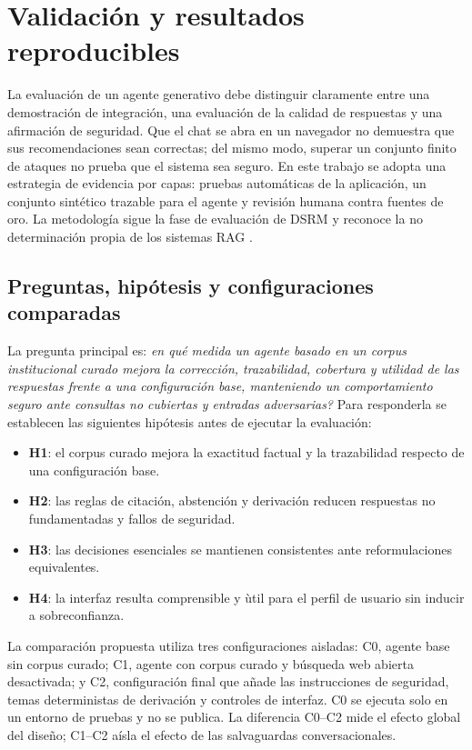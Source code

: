 \chapter{Validaci\'on y resultados reproducibles}
\label{chap:validacion}

La evaluaci\'on de un agente generativo debe distinguir claramente entre una demostraci\'on de integraci\'on, una evaluaci\'on de la calidad de respuestas y una afirmaci\'on de seguridad. Que el chat se abra en un navegador no demuestra que sus recomendaciones sean correctas; del mismo modo, superar un conjunto finito de ataques no prueba que el sistema sea seguro. En este trabajo se adopta una estrategia de evidencia por capas: pruebas autom\'aticas de la aplicaci\'on, un conjunto sint\'etico trazable para el agente y revisi\'on humana contra fuentes de oro. La metodolog\'ia sigue la fase de evaluaci\'on de DSRM \cite{peffers2007} y reconoce la no determinaci\'on propia de los sistemas RAG \cite{lewis2020rag,ragas2024}.

\section{Preguntas, hip\'otesis y configuraciones comparadas}

La pregunta principal es: \emph{\textquestiondown en qu\'e medida un agente basado en un corpus institucional curado mejora la correcci\'on, trazabilidad, cobertura y utilidad de las respuestas frente a una configuraci\'on base, manteniendo un comportamiento seguro ante consultas no cubiertas y entradas adversarias?} Para responderla se establecen las siguientes hip\'otesis antes de ejecutar la evaluaci\'on:

\begin{itemize}
  \item \textbf{H1}: el corpus curado mejora la exactitud factual y la trazabilidad respecto de una configuraci\'on base.
  \item \textbf{H2}: las reglas de citaci\'on, abstenci\'on y derivaci\'on reducen respuestas no fundamentadas y fallos de seguridad.
  \item \textbf{H3}: las decisiones esenciales se mantienen consistentes ante reformulaciones equivalentes.
  \item \textbf{H4}: la interfaz resulta comprensible y \`util para el perfil de usuario sin inducir a sobreconfianza.
\end{itemize}

La comparaci\'on propuesta utiliza tres configuraciones aisladas: C0, agente base sin corpus curado; C1, agente con corpus curado y b\'usqueda web abierta desactivada; y C2, configuraci\'on final que a\~nade las instrucciones de seguridad, temas deterministas de derivaci\'on y controles de interfaz. C0 se ejecuta solo en un entorno de pruebas y no se publica. La diferencia C0--C2 mide el efecto global del dise\~no; C1--C2 a\'isla el efecto de las salvaguardas conversacionales.

